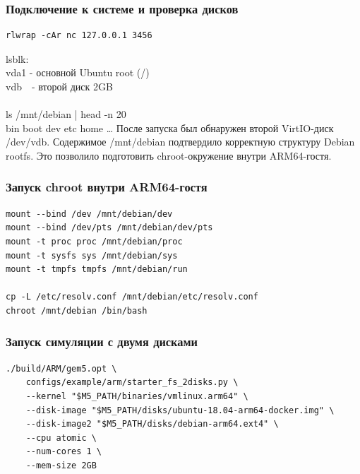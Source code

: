 \documentclass{beamer}
\begin{document}
\begin{frame}[fragile]
\frametitle{Подключение к системе и проверка дисков}
\begin{lstlisting}[basicstyle=\small\ttfamily,frame=none]
rlwrap -cAr nc 127.0.0.1 3456
\end{lstlisting}
{\small\ttfamily\obeylines\obeyspaces%
lsblk:\\
vda1 - основной Ubuntu root (/)\\
vdb\ \ - второй диск 2GB\\
~\\
ls /mnt/debian | head -n 20\\
bin boot dev etc home \ldots%
}
\medskip
После запуска был обнаружен второй VirtIO-диск /dev/vdb.
Содержимое /mnt/debian подтвердило корректную структуру Debian rootfs.
Это позволило подготовить chroot-окружение внутри ARM64-гостя.
\end{frame}

\begin{frame}[fragile]
\frametitle{Запуск chroot внутри ARM64-гостя}
\begin{lstlisting}[basicstyle=\small\ttfamily,frame=none]
mount --bind /dev /mnt/debian/dev
mount --bind /dev/pts /mnt/debian/dev/pts
mount -t proc proc /mnt/debian/proc
mount -t sysfs sys /mnt/debian/sys
mount -t tmpfs tmpfs /mnt/debian/run

cp -L /etc/resolv.conf /mnt/debian/etc/resolv.conf
chroot /mnt/debian /bin/bash
\end{lstlisting}
\end{frame}

\begin{frame}[fragile]
\frametitle{Запуск симуляции с двумя дисками}
\begin{lstlisting}[basicstyle=\scriptsize\ttfamily,frame=none,breaklines=true,breakatwhitespace=false]
./build/ARM/gem5.opt \
    configs/example/arm/starter_fs_2disks.py \
    --kernel "$M5_PATH/binaries/vmlinux.arm64" \
    --disk-image "$M5_PATH/disks/ubuntu-18.04-arm64-docker.img" \
    --disk-image2 "$M5_PATH/disks/debian-arm64.ext4" \
    --cpu atomic \
    --num-cores 1 \
    --mem-size 2GB
\end{lstlisting}
\end{frame}
\end{document}
